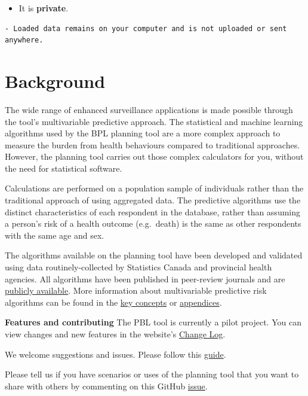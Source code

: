 \documentclass[]{book}
\providecommand{\tightlist}{%
  \setlength{\itemsep}{0pt}\setlength{\parskip}{0pt}}
\begin{document}
\begin{itemize}
\tightlist
\item
  It is \textbf{private}.
\end{itemize}

\begin{verbatim}
- Loaded data remains on your computer and is not uploaded or sent anywhere.
\end{verbatim}

\hypertarget{background}{%
\chapter{Background}\label{background}}

The wide range of enhanced surveillance applications is made possible through the tool's multivariable predictive approach. The statistical and machine learning algorithms used by the BPL planning tool are a more complex approach to measure the burden from health behaviours compared to traditional approaches.\citep{manuel2018} However, the planning tool carries out those complex calculators for you, without the need for statistical software.

Calculations are performed on a population sample of individuals rather than the traditional approach of using aggregated data. The predictive algorithms use the distinct characteristics of each respondent in the database, rather than assuming a person's risk of a health outcome (e.g.~death) is the same as other respondents with the same age and sex.

The algorithms available on the planning tool have been developed and validated using data routinely-collected by Statistics Canada and provincial health agencies. All algorithms have been published in peer-review journals and are \href{https://github.com/Big-Life-Lab/predictive-algorithms}{publicly available}. More information about multivariable predictive risk algorithms can be found in the \protect\hyperlink{keyconcepts}{key concepts} or \protect\hyperlink{mport}{appendices}.

\textbf{Features and contributing}
The PBL tool is currently a pilot project. You can view changes and new features in the website's \href{http://http://planning.projectbiglife.ca/}{Change Log}.

We welcome suggestions and issues. Please follow this \href{https://github.com/Big-Life-Lab/PBL-Planning-Tool-Guidance/blob/master/contributing/CONTRIBUTING.md}{guide}.

Please tell us if you have scenarios or uses of the planning tool that you want to share with others by commenting on this GitHub \href{https://github.com/Big-Life-Lab/PBL-Planning-Tool-Guidance/issues/9}{issue}.
\end{document}
